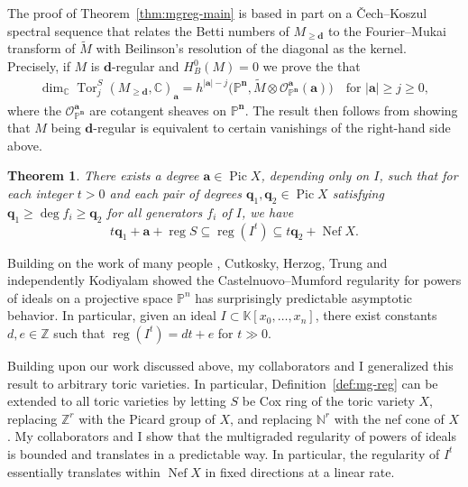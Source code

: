 \documentclass[11pt,reqno]{amsart}
\newtheorem{theorem}[lemma]{Theorem}
\theoremstyle{remark}
\newcommand{\reg}{\operatorname{reg}}
\newcommand{\Tor}{\operatorname{Tor}}
\newcommand{\Pic}{\operatorname{Pic}}
\newcommand{\Nef}{\operatorname{Nef}}
\newcommand{\qq}{\mathbf q}
\renewcommand{\aa}{\mathbf a}
\newcommand{\dd}{\mathbf d}
\newcommand{\nn}{\mathbf n}
\renewcommand{\O}{\mathcal{O}}
\newcommand{\C}{\mathbb{C}}
\newcommand{\K}{\mathbb{K}}
\newcommand{\N}{\mathbb{N}}
\renewcommand{\P}{\mathbb{P}}
\newcommand{\Z}{\mathbb{Z}}
\renewcommand{\cite}[1]{{}}
\begin{document}
The proof of Theorem~\ref{thm:mgreg-main} is based in part on a \v{C}ech--Koszul spectral sequence that relates the Betti numbers of $M_{\geq\dd}$ to the Fourier--Mukai transform of $\widetilde{M}$ with Beilinson's resolution of the diagonal as the kernel.  Precisely, if $M$ is $\dd$-regular and $H_B^0(M)=0$ we prove the that
\begin{align*}\label{eq:magic-equality}
  \dim_{\C}\Tor^S_j(M_{\geq\dd}, \C)_\aa = h^{|\aa|-j}\big(\P^{\nn}, \widetilde{M}\otimes\O_{\P^{\nn}}^\aa(\aa)\big) \quad \text{for } |\aa|\geq j\geq 0,
\end{align*}
where the $\O_{\P^{\nn}}^\aa$ are cotangent sheaves on $\P^\nn$. The result then follows from showing that $M$ being $\dd$-regular is equivalent to certain vanishings of the right-hand side above. 

\begin{theorem}
  There exists a degree $\aa\in\Pic X$, depending only on $I$, such that for each integer $t>0$ and each pair of degrees $\qq_1,\qq_2\in\Pic X$ satisfying $\qq_1\geq\deg f_i\geq\qq_2$ for all generators $f_i$ of $I$, we have
	\[ t\qq_1+\aa+\reg S \subseteq \reg\!\left(I^t\right) \subseteq t\qq_2+\Nef X. \]
\end{theorem}



Building on the work of many people \cite{bertramEinLazarsfeld91,chandler97,smithSwanson97,swanson97}, Cutkosky, Herzog, Trung \cite{cutkoskyHerzogTrung99} and independently Kodiyalam \cite{kodiyalam00} showed the Castelnuovo--Mumford regularity for powers of ideals on a projective space $\P^n$ has surprisingly predictable asymptotic behavior. In particular, given an ideal $I\subset \K[x_0,\ldots,x_n]$, there exist constants $d,e\in\Z$ such that $\reg\!\left(I^t\right) = dt+e$ for $t\gg0$.

Building upon our work discussed above, my collaborators and I generalized this result to arbitrary toric varieties. In particular, Definition~\ref{def:mg-reg} can be extended to all toric varieties by letting $S$ be Cox ring of the toric variety $X$, replacing $\Z^r$ with the Picard group of $X$, and replacing $\N^{r}$ with the nef cone of $X$. My collaborators and I show that the multigraded regularity of powers of ideals is bounded and translates in a predictable way. In particular, the regularity of $I^{t}$ essentially translates within $\Nef X$ in fixed directions at a linear rate.
\end{document}

